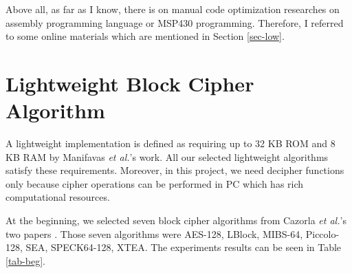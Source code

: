 \documentclass[sigconf, review=false]{acmart}
\begin{document}
Above all, as far as I know, there is on manual code optimization researches
on assembly programming language or MSP430 programming.
Therefore, I referred to some online materials which are mentioned in Section \ref{sec-low}.


\section{Lightweight Block Cipher Algorithm} \label{sec-block}

A lightweight implementation is defined as requiring up to 32 KB ROM and 8 KB RAM by Manifavas \textit{et al.}'s work\cite{manifavas2014lightweight}.
All our selected lightweight algorithms satisfy these requirements.
Moreover, in this project, we need decipher functions only because cipher operations can be performed in PC which has rich computational resources.

At the beginning, we selected seven block cipher algorithms from Cazorla \textit{et al.}'s two papers \cite{cazorla2013survey, cazorla2015survey}.
Those seven algorithms were AES-128\cite{pub2001197}, LBlock\cite{wu2011lblock}, MIBS-64\cite{izadi2009mibs},
Piccolo-128\cite{shibutani2011piccolo}, SEA\cite{standaert2006sea}, SPECK64-128\cite{beaulieu2015simon}, XTEA\cite{needham1997tea, wheeler1998correction}.
The experiments results can be seen in Table \ref{tab-beg}.
\end{document}
